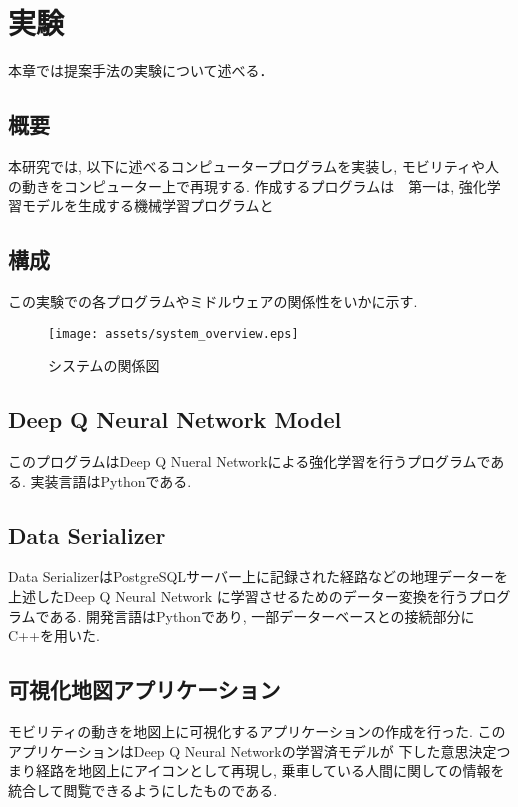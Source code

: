 \chapter{実験}
\label{implementation}

本章では提案手法の実験について述べる．

\section{概要}

本研究では, 以下に述べるコンピュータープログラムを実装し, モビリティや人の動きをコンピューター上で再現する.
作成するプログラムは　第一は, 強化学習モデルを生成する機械学習プログラムと

\section{構成}

この実験での各プログラムやミドルウェアの関係性をいかに示す.


\begin{figure}[H]
  \centering  %
  \texttt{[image: assets/system\_overview.eps]}
  \caption{システムの関係図}  \label{sample}
\end{figure}

\section{Deep Q Neural Network Model}

このプログラムはDeep Q Nueral Networkによる強化学習を行うプログラムである. 実装言語はPythonである.



\section{Data Serializer}

Data SerializerはPostgreSQLサーバー上に記録された経路などの地理データーを上述したDeep Q Neural Network
に学習させるためのデーター変換を行うプログラムである.
開発言語はPythonであり, 一部データーベースとの接続部分にC++を用いた.


\section{可視化地図アプリケーション}

モビリティの動きを地図上に可視化するアプリケーションの作成を行った. このアプリケーションはDeep Q Neural Networkの学習済モデルが
下した意思決定つまり経路を地図上にアイコンとして再現し, 乗車している人間に関しての情報を統合して閲覧できるようにしたものである.


